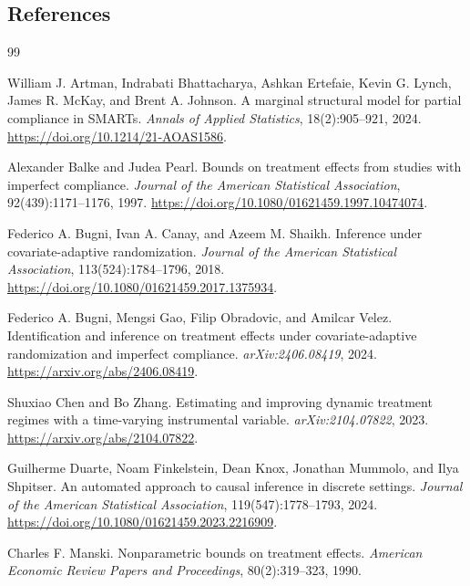 \documentclass[11pt]{article}
\theoremstyle{definition}
\theoremstyle{plain}
\theoremstyle{remark}
\begin{document}
\subsection*{References}
\begin{thebibliography}{99}

William J. Artman, Indrabati Bhattacharya, Ashkan Ertefaie, Kevin G. Lynch, James R. McKay, and Brent A. Johnson.
\newblock A marginal structural model for partial compliance in SMARTs.
\newblock \emph{Annals of Applied Statistics}, 18(2):905--921, 2024.
\newblock \url{https://doi.org/10.1214/21-AOAS1586}.

Alexander Balke and Judea Pearl.
\newblock Bounds on treatment effects from studies with imperfect compliance.
\newblock \emph{Journal of the American Statistical Association}, 92(439):1171--1176, 1997.
\newblock \url{https://doi.org/10.1080/01621459.1997.10474074}.

Federico A. Bugni, Ivan A. Canay, and Azeem M. Shaikh.
\newblock Inference under covariate-adaptive randomization.
\newblock \emph{Journal of the American Statistical Association}, 113(524):1784--1796, 2018.
\newblock \url{https://doi.org/10.1080/01621459.2017.1375934}.

Federico A. Bugni, Mengsi Gao, Filip Obradovic, and Amilcar Velez.
\newblock Identification and inference on treatment effects under covariate-adaptive randomization and imperfect compliance.
\newblock \emph{arXiv:2406.08419}, 2024.
\newblock \url{https://arxiv.org/abs/2406.08419}.

Shuxiao Chen and Bo Zhang.
\newblock Estimating and improving dynamic treatment regimes with a time-varying instrumental variable.
\newblock \emph{arXiv:2104.07822}, 2023.
\newblock \url{https://arxiv.org/abs/2104.07822}.

Guilherme Duarte, Noam Finkelstein, Dean Knox, Jonathan Mummolo, and Ilya Shpitser.
\newblock An automated approach to causal inference in discrete settings.
\newblock \emph{Journal of the American Statistical Association}, 119(547):1778--1793, 2024.
\newblock \url{https://doi.org/10.1080/01621459.2023.2216909}.

Charles F. Manski.
\newblock Nonparametric bounds on treatment effects.
\newblock \emph{American Economic Review Papers and Proceedings}, 80(2):319--323, 1990.


\end{thebibliography}
\end{document}
